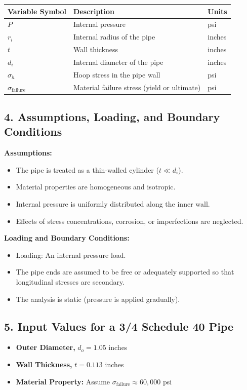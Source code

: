 \documentclass[12pt]{article}
\begin{document}
\begin{center}
\begin{tabular}{|>{\raggedright}p{2cm}|>{\raggedright}p{6cm}|>{\raggedright\arraybackslash}p{2cm}|}
\hline
\textbf{Variable Symbol} & \textbf{Description} & \textbf{Units} \\
\hline
$P$ & Internal pressure & psi \\
\hline
$r_i$ & Internal radius of the pipe & inches \\
\hline
$t$ & Wall thickness & inches \\
\hline
$d_i$ & Internal diameter of the pipe & inches \\
\hline
$\sigma_h$ & Hoop stress in the pipe wall & psi \\
\hline
$\sigma_{\text{failure}}$ & Material failure stress (yield or ultimate) & psi \\
\hline
\end{tabular}
\end{center}

\subsection*{4. Assumptions, Loading, and Boundary Conditions}
\textbf{Assumptions:}
\begin{itemize}
    \item The pipe is treated as a thin-walled cylinder ($t \ll d_i$).
    \item Material properties are homogeneous and isotropic.
    \item Internal pressure is uniformly distributed along the inner wall.
    \item Effects of stress concentrations, corrosion, or imperfections are neglected.
\end{itemize}

\noindent\textbf{Loading and Boundary Conditions:}
\begin{itemize}
    \item Loading: An internal pressure load.
    \item The pipe ends are assumed to be free or adequately supported so that longitudinal stresses are secondary.
    \item The analysis is static (pressure is applied gradually).
\end{itemize}

\subsection*{5. Input Values for a 3/4 Schedule 40 Pipe}
\begin{itemize}
    \item \textbf{Outer Diameter,} $d_o = 1.05$ inches
    \item \textbf{Wall Thickness,} $t = 0.113$ inches
    \item \textbf{Material Property:} Assume $\sigma_{\text{failure}} \approx 60,000$ psi
\end{itemize}
\end{document}
